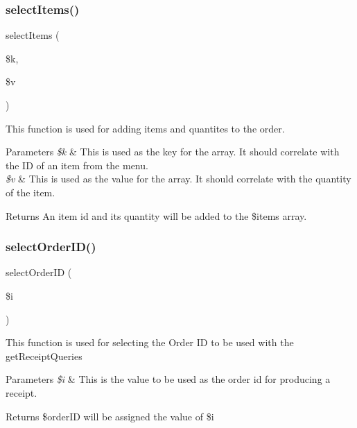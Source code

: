 \subsubsection{\texorpdfstring{selectItems()}{selectItems()}}
{\footnotesize\ttfamily select\+Items (\begin{DoxyParamCaption}\item[{}]{\$k,  }\item[{}]{\$v }\end{DoxyParamCaption})}

This function is used for adding items and quantites to the order. 
\begin{DoxyParams}{Parameters}
{\em \$k} & This is used as the key for the array. It should correlate with the ID of an item from the menu. \\
\hline
{\em \$v} & This is used as the value for the array. It should correlate with the quantity of the item. \\
\hline
\end{DoxyParams}
\begin{DoxyReturn}{Returns}
An item id and its quantity will be added to the \$items array. 
\end{DoxyReturn}
\mbox{\label{_pickup___order___selection_8class_8php_ad8c931daea4616337e35d0add407efa0}} 
\subsubsection{\texorpdfstring{selectOrderID()}{selectOrderID()}}
{\footnotesize\ttfamily select\+Order\+ID (\begin{DoxyParamCaption}\item[{}]{\$i }\end{DoxyParamCaption})}

This function is used for selecting the Order ID to be used with the get\+Receipt\+Queries 
\begin{DoxyParams}{Parameters}
{\em \$i} & This is the value to be used as the order id for producing a receipt. \\
\hline
\end{DoxyParams}
\begin{DoxyReturn}{Returns}
\$order\+ID will be assigned the value of \$i 
\end{DoxyReturn}
\mbox{\label{_pickup___order___selection_8class_8php_aa3d29d516196eed16f5553dd20b8011e}} 
